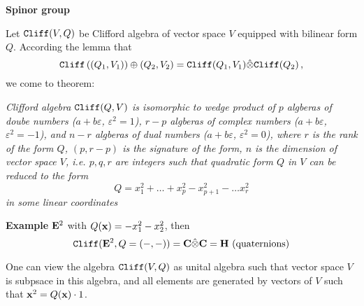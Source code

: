 



\baselineskip=14pt
\def\vare {\varepsilon}
\def\t {\tilde}
\def\a {\alpha}
\def\K {{\bf K}}
\def\N {{\bf N}}
\def\C {{\bf C}}
\def\L {{\cal L}}
\def\E {{\bf E}}
\def\s {{\sigma}}
\def\S {{\Sigma}}
\def\p{\partial}
\def\vare{{\varepsilon}}
\def\Q {{\bf Q}}
\def\D {{\cal D}}
\def\G {{\Gamma}}
\def\Z {{\bf Z}}
\def\R  {{\bf R}}
\def\l {\lambda}
\def\ll {{\bf l}}
\def\degree {{\bf {\rm degree}\,\,}}
\def \finish {${\,\,\vrule height1mm depth2mm width 8pt}$}
\def \m {\medskip}
\def\p {\partial}
\def\r {{\bf r}}
\def\pt {{\bf p}}
\def\v {{\bf v}}
\def\n {{\bf n}}
\def\t {{\bf t}}
\def\b {{\bf b}}
\def\c {{\bf c }}
\def\e{{\bf e}}
\def\f{{\bf f}}
\def\ac {{\bf a}}
\def \X   {{\bf X}}
\def \Y   {{\bf Y}}
\def \x   {{\bf x}}
\def \y   {{\bf y}}
\def\w {{\omega}}
\def \Tr  {{\rm Tr\,}}
\def\dim {{\rm dim\,\,}}
\def\t {{\tilde}} 
\def\dist {{\hbox{\tt "distance"}}}
\def  \dim {{\rm dim\,}}
\def  \Im  {{\rm Im\,}}
\def  \ker {{\rm ker\,}}


\def \Cl {\hbox{\tt Cliff}}

\centerline   {\bf Spinor group}


          
Let $\Cl (V,Q)$ be Clifford algebra of vector space
$V$  equipped with bilinear form  $Q$.
According the lemma that
           $$
\Cl \left(
 \left(Q_1,V_1\right)
   \right)
\oplus 
\left(Q_2,V_2\right)
=
\Cl (Q_1,V_1){\hat \otimes}
\Cl (Q_2)\,,
         $$
we come to theorem:

{\it Clifford algebra $\Cl(Q,V)$ is isomorphic to
wedge product of 
$p$ algberas of doube numbers
($a+b\vare$, $\vare^2=1$), 
$r-p$ algberas of complex  numbers
($a+b\vare$, $\vare^2=-1$), and 
$n-r$ algberas of dual numbers
($a+b\vare$, $\vare^2=0$), 
where   
$r$ is the rank of the form $Q$, 
$(p,r-p)$
is the signature of the form, 
$n$ is the dimension of  vector space $V$, 
i.e.  $p,q,r$ are integers such that  quadratic form $Q$
in $V$ can be reduced to the form  
          $$
Q=x_1^2+\dots+x_p^2-x_{p+1}^2-\dots x_r^2
          $$
in some linear coordinates
}

\smallskip

{\bf Example}  $\E^2$ with $Q(\x)=-x_1^2-x_2^2$,
then
     $$
\Cl(\E^2,Q=(-,-))=\C\hat\otimes\C={\bf H}\,\, \hbox
{(quaternions)}
     $$

\smallskip

One can view the algebra  $\Cl(V,Q)$ as unital algebra
such that vector space $V$ is subpsace in this algebra,
and all elements are generated by vectors of $V$  such
that $\x^2=Q(\x)\cdot 1$.


